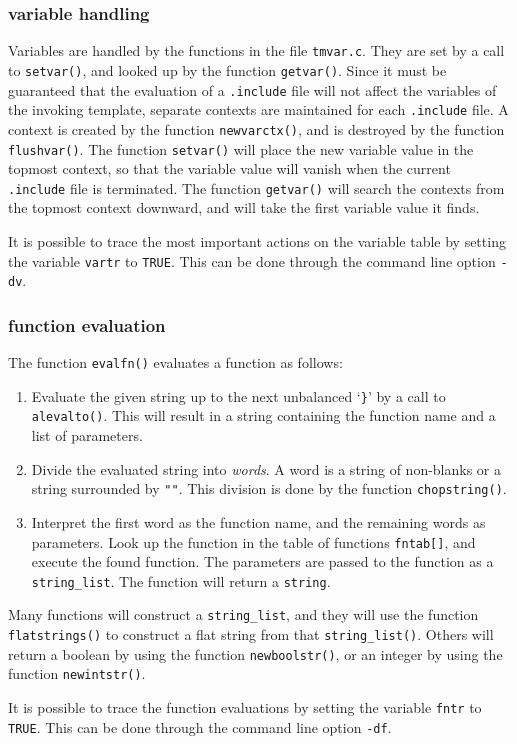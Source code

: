\subsubsection{variable handling}
Variables are handled by the functions in the file \texttt{tmvar.c}.
They are set by a call to \texttt{setvar()},
and looked up by the function \texttt{getvar()}.
Since it must be guaranteed that the evaluation of a \texttt{.include} file
will not affect the variables of the invoking template, separate contexts
are maintained for each \texttt{.include} file.
A context is created by the function \texttt{newvarctx()},
and is destroyed by the function \texttt{flushvar()}.
The function \texttt{setvar()} will place the new variable value in the topmost
context, so that the variable value will vanish when the current
\texttt{.include} file is terminated.
The function \texttt{getvar()} will search the contexts from the topmost
context downward, and will take the first variable value it finds.
\par
It is possible to trace the most important actions
on the variable table by setting the variable \texttt{vartr} to \texttt{TRUE}.
This can be done through the command line option \texttt{-dv}.
\subsubsection{function evaluation}
The function \texttt{evalfn()} evaluates a function as follows:
\begin{enumerate}
\item Evaluate the given string up to the next unbalanced `\verb!}!'
      by a call to \texttt{alevalto()}.
      This will result in a string containing the function name and a list of
      parameters.

\item Divide the evaluated string into \emph{words}. A word is a
      string of non-blanks or a string surrounded by \verb!""!.
      This division is done by the function \texttt{chopstring()}.

\item Interpret the first word as the function name, and the
      remaining words as parameters.
      Look up the function in the table of functions \texttt{fntab[]},
      and execute the found function. The parameters are passed
      to the function as a \texttt{string\_list}. The function
      will return a \texttt{string}.
\end{enumerate}
Many functions will construct a \texttt{string\_list},
and they will use the function \texttt{flatstrings()} to construct
a flat string from that \texttt{string\_list()}.
Others will return a boolean by using the function \texttt{newboolstr()},
or an integer by using the function \texttt{newintstr()}.
\par
It is possible to trace the function evaluations
by setting the variable \texttt{fntr} to \texttt{TRUE}.
This can be done through the command line option \texttt{-df}.
